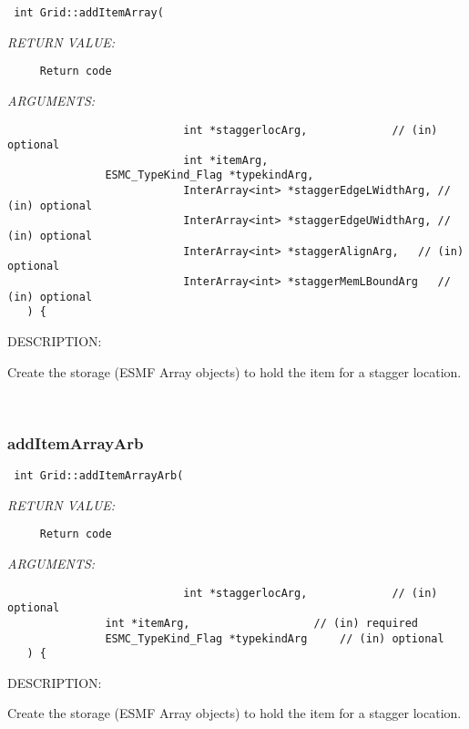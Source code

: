  
\begin{verbatim} int Grid::addItemArray(
 \end{verbatim}{\em RETURN VALUE:}
\begin{verbatim}     Return code\end{verbatim}{\em ARGUMENTS:}
\begin{verbatim}                           int *staggerlocArg,             // (in) optional
                           int *itemArg,
               ESMC_TypeKind_Flag *typekindArg,          
                           InterArray<int> *staggerEdgeLWidthArg, // (in) optional
                           InterArray<int> *staggerEdgeUWidthArg, // (in) optional
                           InterArray<int> *staggerAlignArg,   // (in) optional 
                           InterArray<int> *staggerMemLBoundArg   // (in) optional 
   ) {\end{verbatim}
{\sf DESCRIPTION:\\ }


     Create the storage (ESMF Array objects) to hold the item for a
   stagger location.  
 
\mbox{}\hrulefill\ 
 
\subsubsection [addItemArrayArb] {addItemArrayArb}


  
\begin{verbatim} int Grid::addItemArrayArb(
 \end{verbatim}{\em RETURN VALUE:}
\begin{verbatim}     Return code\end{verbatim}{\em ARGUMENTS:}
\begin{verbatim}                           int *staggerlocArg,             // (in) optional
               int *itemArg,                   // (in) required
               ESMC_TypeKind_Flag *typekindArg     // (in) optional          
   ) {\end{verbatim}
{\sf DESCRIPTION:\\ }


     Create the storage (ESMF Array objects) to hold the item for a
   stagger location.  
 
\mbox{}\hrulefill\ 
 
